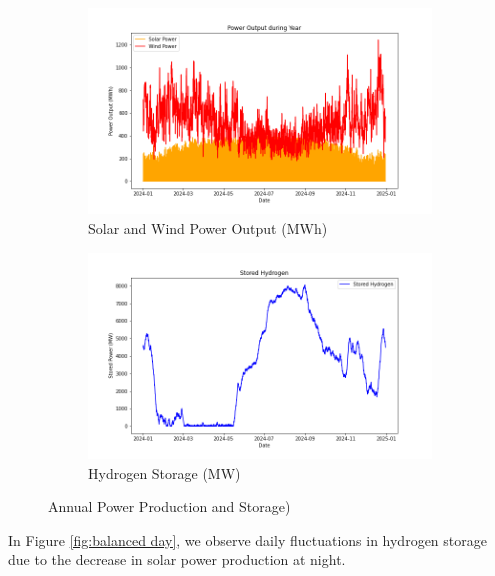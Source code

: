 \documentclass[english]{article}
\numberwithin{definition}{section}
\numberwithin{theorem}{section}
\numberwithin{problem}{section}
\begin{document}
\begin{figure}[H]
\centering
\begin{subfigure}{.5\textwidth}
  \centering
  \includegraphics[width=\linewidth]{immagini/ImmaginiOptimization/balancedPowerOutput.png}
  \caption{Solar and Wind Power Output (MWh)}
  \label{fig:balance year power}
\end{subfigure}%
\begin{subfigure}{.5\textwidth}
  \centering
  \includegraphics[width=\linewidth]{immagini/ImmaginiOptimization/HHyear.png}
  \caption{Hydrogen Storage (MW)}
  \label{fig:balanced year hydrogen}
\end{subfigure}
\caption{Annual Power Production and Storage)}
\label{fig:balanced year}
\end{figure}

In Figure \ref{fig:balanced day}, we observe daily fluctuations in hydrogen storage due to the decrease in solar power production at night.
\end{document}
